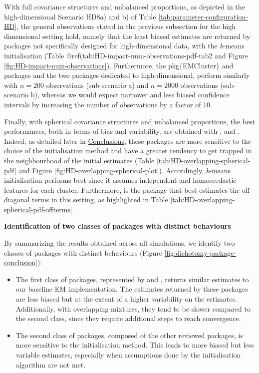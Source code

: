 \color{blue}

With full covariance structures and unbalanced proportions, as depicted in the high-dimensional Scenario HD8a) and b) of Table \ref{tab:parameter-configuration-HD}, the general observations stated in the previous subsection for the high dimensional setting hold, namely that the least biased estimates are returned by packages not specifically designed for high-dimensional data, with the \emph{k}-means initialisation (Table @ref(tab:HD-impact-num-observations-pdf-tab2 and Figure \ref{fig:HD-impact-num-observations}). Furthermore, the pkg\{EMCluster\} and  packages and the two packages dedicated to high-dimensional, perform similarly with \(n=200\) observations (sub-scenario a) and \(n=2000\) observations (sub-scenario b), whereas we would expect narrower and less biased confidence intervals by increasing the number of observations by a factor of 10.

Finally, with spherical covariance structures and unbalanced proportions, the best performances, both in terms of bias and variability, are obtained with ,  and . Indeed, as detailed later in \protect\hyperlink{conclusions}{Conclusions}, these packages are more sensitive to the choice of the initialisation method and have a greater tendency to get trapped in the neighbourhood of the initial estimates (Table \ref{tab:HD-overlapping-spherical-pdf} and Figure \ref{fig:HD-overlapping-spherical-plot}). Accordingly, \emph{k}-means initialisation performs best since it assumes independent and homoscedastic features for each cluster.
Furthermore,  is the package that best estimates the off-diagonal terms in this setting, as highlighted in Table \ref{tab:HD-overlapping-spherical-pdf-offterms}.
\color{black}

\textbf{Identification of two classes of packages with distinct behaviours}

By summarizing the results obtained across all simulations, we identify two classes of packages with distinct behaviours (Figure
\ref{fig:dichotomy-package-conclusion}):

\begin{itemize}
\item
  The first class of packages, represented by  and , returns similar estimates to our baseline EM implementation. The estimates returned by these packages are less biased but at the extent of a higher variability on the estimates. Additionally, with overlapping mixtures, they tend to be slower compared to the second class, since they require additional steps to reach convergence.
\item
  The second class of packages, composed of the other
  reviewed packages, is more sensitive to the initialisation method. This leads to more
  biased but less variable estimates, especially when assumptions done by
  the initialisation algorithm are not met.
\end{itemize}

